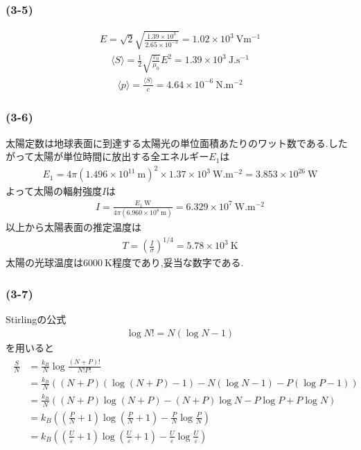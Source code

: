 \subsubsection*{(3-5)}
\begin{align}
  E=\sqrt{2}\sqrt{\frac{1.39\times10^3}{2.65\times10^{-3}}}=1.02\times10^{3}\ \si{\volt\metre^{-1}}
\end{align}
\begin{align}
  \langle S\rangle=\frac{1}{2}\sqrt{\frac{\varepsilon_0}{\mu_0}}E^2=1.39\times10^3\ \si{\joule.\second^{-1}}
\end{align}
\begin{align}
  \langle p\rangle=\frac{\langle S\rangle}{c}=4.64\times10^{-6}\ \si{\newton.\metre^{-2}}
\end{align}
\subsubsection*{(3-6)}
太陽定数は地球表面に到達する太陽光の単位面積あたりのワット数である.したがって太陽が単位時間に放出する全エネルギー$E_1$は
\begin{align}
  E_1=4\pi(1.496\times10^11\ \si{\metre})^2\times1.37\times10^3\ \si{\watt.\metre^{-2}}=3.853\times10^{26}\ \si{\watt}
\end{align}
よって太陽の輻射強度$I$は
\begin{align}
  I=\frac{E_1\ \si{\watt}}{4\pi(6.960\times10^8\ \si{\metre})}=6.329\times10^7\ \si{\watt.\metre^{-2}}
\end{align}
以上から太陽表面の推定温度は
\begin{align}
  T=\left(\frac{I}{\sigma}\right)^{1/4}=5.78\times10^3\ \si{\kelvin}
\end{align}
太陽の光球温度は$6000\ \si{\kelvin}$程度であり,妥当な数字である.
\subsubsection*{(3-7)}
Stirlingの公式
\begin{align}
  \log N!=N(\log N-1)
\end{align}
を用いると
\begin{align}
  \begin{split}
    \frac{S}{N}&=\frac{k_B}{N}\log\frac{(N+P)!}{N!P!}\\
    &=\frac{k_B}{N}((N+P)(\log(N+P)-1)-N(\log N-1)-P(\log P-1))\\
    &=\frac{k_B}{N}((N+P)\log(N+P)-(N+P)\log N-P\log P+P\log N)\\
    &=k_B\left(\left(\frac{P}{N}+1\right)\log\left(\frac{P}{N}+1\right)-\frac{P}{N}\log\frac{P}{N}\right)\\
    &=k_B\left(\left(\frac{U}{\varepsilon}+1\right)\log\left(\frac{U}{\varepsilon}+1\right)-\frac{U}{\varepsilon}\log\frac{U}{\varepsilon}\right)
  \end{split}
\end{align}
